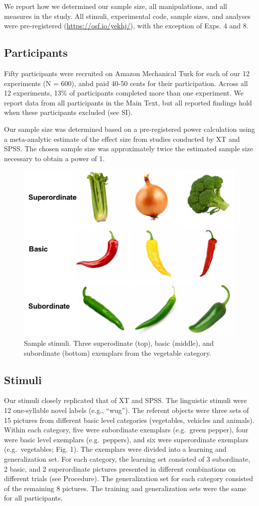 \documentclass[english,floatsintext,man]{apa6}
\theoremstyle{definition}
\theoremstyle{definition}
\theoremstyle{remark}
\begin{document}
We report how we determined our sample size, all manipulations, and all
measures in the study. All stimuli, experimental code, sample sizes, and
analyses were pre-registered (\url{https://osf.io/yekhj/}), with the
exception of Exps. 4 and 8.

\subsection{Participants}\label{participants}

Fifty participants were recruited on Amazon Mechanical Turk for each of
our 12 experiments (N = 600), anbd paid 40-50 cents for their
participation. Across all 12 experiments, 13\% of participants completed
more than one experiment. We report data from all participants in the
Main Text, but all reported findings hold when these participants
excluded (see SI).

Our sample size was determined based on a pre-registered power
calculation using a meta-analytic estimate of the effect size from
studies conducted by XT and SPSS. The chosen sample size was
approximately twice the estimated sample size necessary to obtain a
power of 1.

\begin{figure}[t!]
 
 {\centering \includegraphics[width=0.5\linewidth]{figs/stim} 
 
 }
 
 \caption{Sample stimuli. Three superodinate (top), basic (middle), and subordinate (bottom) exemplars from the vegetable category.}\label{fig:unnamed-chunk-2}
 \end{figure}

\subsection{Stimuli}\label{stimuli}

Our stimuli closely replicated that of XT and SPSS. The linguistic
stimuli were 12 one-syllable novel labels (e.g., \enquote{wug}). The
referent objects were three sets of 15 pictures from different basic
level categories (vegetables, vehicles and animals). Within each
category, five were subordinate exemplars (e.g.~green pepper), four were
basic level exemplars (e.g.~peppers), and six were superordinate
exemplars (e.g.~vegetables; Fig. 1). The exemplars were divided into a
learning and generalization set. For each category, the learning set
consisted of 3 subordinate, 2 basic, and 2 superordinate pictures
presented in different combinations on different trials (see Procedure).
The generalization set for each category consisted of the remaining 8
pictures. The training and generalization sets were the same for all
participants.
\end{document}
